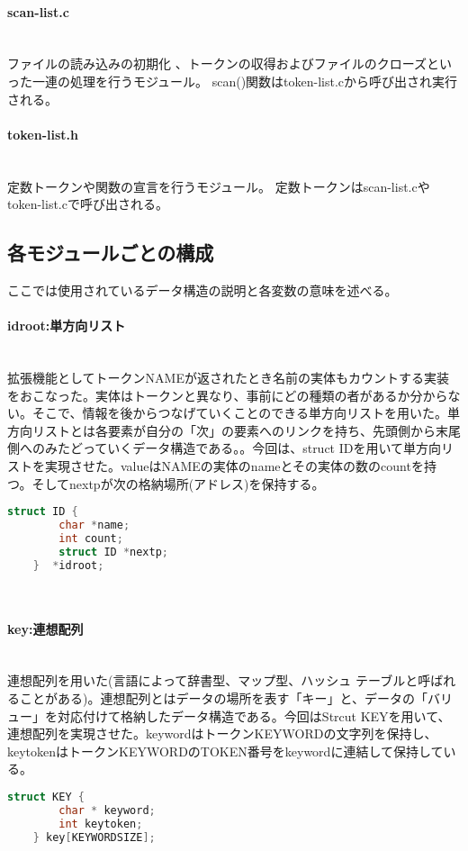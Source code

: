 \documentclass[a4j]{jsarticle}
\begin{document}
    \paragraph{scan-list.c}
    　\\
    ファイルの読み込みの初期化
    、トークンの収得およびファイルのクローズといった一連の処理を行うモジュール。
    scan()関数はtoken-list.cから呼び出され実行される。
    \paragraph{token-list.h}
    　\\
    定数トークンや関数の宣言を行うモジュール。
    定数トークンはscan-list.cやtoken-list.cで呼び出される。


  \subsection{各モジュールごとの構成}
  ここでは使用されているデータ構造の説明と各変数の意味を述べる。\\
  \paragraph{idroot:単方向リスト}
  　\\
  拡張機能としてトークンNAMEが返されたとき名前の実体もカウントする実装をおこなった。実体はトークンと異なり、事前にどの種類の者があるか分からない。そこで、情報を後からつなげていくことのできる単方向リストを用いた。単方向リストとは各要素が自分の「次」の要素へのリンクを持ち、先頭側から末尾側へのみたどっていくデータ構造である。\cite{cite:list}。今回は、struct IDを用いて単方向リストを実現させた。valueはNAMEの実体のnameとその実体の数のcountを持つ。そしてnextpが次の格納場所(アドレス)を保持する。
  \begin{lstlisting}[language=C,caption={構造体ID in id-list.c},label={code:id}]
    struct ID {
    	char *name;
    	int count;
    	struct ID *nextp;
    }  *idroot;
  \end{lstlisting}
  　\\
  \paragraph{key:連想配列}
  　\\
  連想配列を用いた(言語によって辞書型、マップ型、ハッシュ テーブルと呼ばれることがある)。連想配列とはデータの場所を表す「キー」と、データの「バリュー」を対応付けて格納したデータ構造である。\cite{cite:list}今回はStrcut KEYを用いて、連想配列を実現させた。keywordはトークンKEYWORDの文字列を保持し、keytokenはトークンKEYWORDのTOKEN番号をkeywordに連結して保持している。
  \begin{lstlisting}[language=C,caption={構造体KEY in token-list.h},label={code:key}]
    struct KEY {
    	char * keyword;
    	int keytoken;
    } key[KEYWORDSIZE];
  \end{lstlisting}
\end{document}
